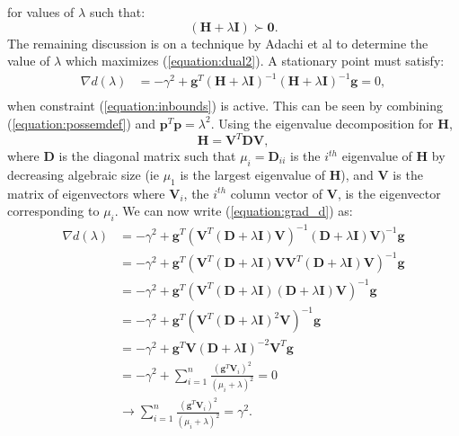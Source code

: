 \documentclass[letterpaper,12pt,titlepage,oneside,final]{book}
\begin{document}
	 for values of $\lambda$ such that:
	\begin{equation}
	(\mathbf{H} + \lambda\mathbf{I}) \succ \mathbf{0}.
	\label{equation:possemdef}
	\end{equation}
	 The remaining discussion is on a technique by Adachi et al \cite{adachi.paper} to determine the value of $\lambda$ which maximizes (\ref{equation:dual2}). A stationary point must satisfy:
	\begin{equation}
	\begin{aligned}
	\nabla d(\lambda) & = -\gamma^{2} + \mathbf{g}^{T}(\mathbf{H} + \lambda\mathbf{I})^{-1}(\mathbf{H} + \lambda\mathbf{I})^{-1}\mathbf{g} = 0, \\
	\end{aligned}
	\label{equation:grad_d}
	\end{equation}
	when constraint (\ref{equation:inbounds}) is active. This can be seen by combining (\ref{equation:possemdef}) and $\mathbf{p}^{T}\mathbf{p} = \lambda^{2}$. Using the eigenvalue decomposition for $\mathbf{H}$,
	\begin{equation}
	\mathbf{H} = \mathbf{V}^{T}\mathbf{D}\mathbf{V},
	\end{equation}
	where $\mathbf{D}$ is the diagonal matrix such that $\mu_{i} = \mathbf{D}_{ii}$ is the $i^{th}$ eigenvalue of $\mathbf{H}$ by decreasing algebraic size (ie $\mu_{1}$ is the largest eigenvalue of $\mathbf{H}$), and $\mathbf{V}$ is the matrix of eigenvectors where $\mathbf{V}_{i}$, the $i^{th}$ column vector of \textbf{V}, is the eigenvector corresponding to $\mu_{i}$. We can now write (\ref{equation:grad_d}) as:
	\begin{equation}
	\begin{aligned}
	\nabla d(\lambda) & = -\gamma^{2} + \mathbf{g}^{T}(\mathbf{V}^{T}(\mathbf{D} + \lambda\mathbf{I})\mathbf{V})^{-1}(\mathbf{D} + \lambda\mathbf{I})\mathbf{V})^{-1}\mathbf{g} \\
	& = -\gamma^{2} + \mathbf{g}^{T}(\mathbf{V}^{T}(\mathbf{D} + \lambda\mathbf{I})\mathbf{V}\mathbf{V}^{T}(\mathbf{D} + \lambda\mathbf{I})\mathbf{V})^{-1}\mathbf{g}  \\
	& = -\gamma^{2} + \mathbf{g}^{T}(\mathbf{V}^{T}(\mathbf{D} + \lambda\mathbf{I})(\mathbf{D} + \lambda\mathbf{I})\mathbf{V})^{-1}\mathbf{g}  \\ 
	& = -\gamma^{2} + \mathbf{g}^{T}(\mathbf{V}^{T}(\mathbf{D} + \lambda\mathbf{I})^{2}\mathbf{V})^{-1}\mathbf{g}  \\ 
	& = -\gamma^{2} + \mathbf{g}^{T}\mathbf{V}(\mathbf{D} + \lambda\mathbf{I})^{-2}\mathbf{V}^{T}\mathbf{g} \\
	& = -\gamma^{2} + \sum_{i=1}^{n}{\frac{(\mathbf{g}^{T}\mathbf{V}_{i})^{2}}{(\mu_{i} + \lambda)^{2}}} = 0\\ 
	&  \rightarrow \sum_{i=1}^{n}{\frac{(\mathbf{g}^{T}\mathbf{V}_{i})^{2}}{(\mu_{i} + \lambda)^{2}}} = \gamma^{2}.
	\end{aligned}
	\label{equation:grad_lagrangian2}
	\end{equation}
\end{document}
